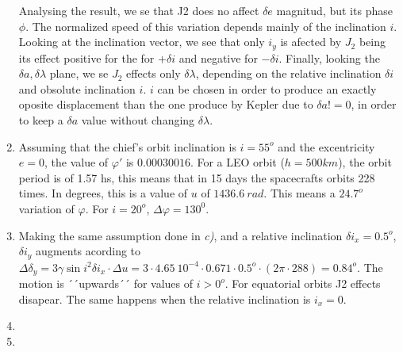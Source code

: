 \documentclass[a4paper]{report}
\begin{document}
\begin{enumerate}[label=\emph{\alph*)}]
    Analysing the result, we se that J2 does no affect $\delta e$ magnitud, but its phase $\phi$. The normalized speed of this variation depends mainly of the inclination $i$. Looking at the inclination vector, we see that only $i_y$ is afected by $J_2$ being its effect positive for the for $+\delta i$ and negative for $-\delta i$. Finally, looking the $\delta a, \delta \lambda$ plane, we se $J_2$ effects only $\delta\lambda$, depending on the relative inclination $\delta i$ and obsolute inclination $i$. $i$ can be chosen in order to produce an exactly oposite displacement than the one produce by Kepler due to $\delta a != 0$, in order to keep a $\delta a$ value without changing $\delta \lambda$.
  
  \item %
    Assuming that the chief's orbit inclination is $i = 55^o$ and the excentricity $e = 0$, the value of $\varphi'$ is $0.00030016$. For a LEO orbit ($h = 500 km$), the orbit period is of 1.57 hs, this means that in 15 days the spacecrafts orbits 228 times. In degrees, this is a value of $u$ of $1436.6~rad$. This means a $24.7^o$ variation of $\varphi$. For $i = 20^o $, $\Delta\varphi = 130^0$.

  \item %
    Making the same assumption done in \textit{c)}, and a relative inclination $\delta i_x=0.5^o$, $\delta i_y$ augments acording to $\Delta \delta_y = 3\gamma\sin{i}^2\delta i_x\cdot\Delta u = 3\cdot 4.65~10^{-4}\cdot0.671\cdot 0.5^o \cdot(2\pi\cdot288) = 0.84^o $. The motion is ´´upwards´´ for values of $i > 0^o$. For equatorial orbits J2 effects disapear. The same happens when the relative inclination is $i_x = 0$.
   

  \item %

  \item %


\end{enumerate}
\end{document}
